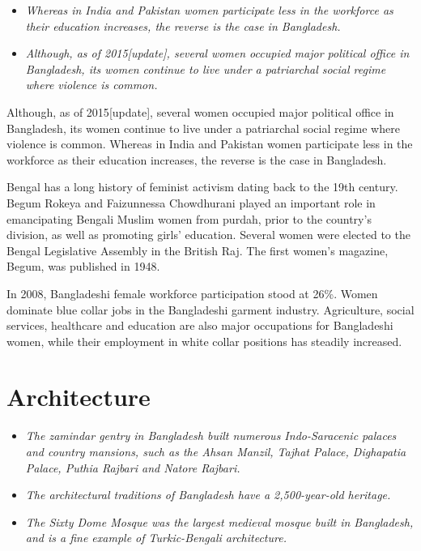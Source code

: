 \begin{itemize}
\item
  \emph{Whereas in India and Pakistan women participate less in the
  workforce as their education increases, the reverse is the case in
  Bangladesh.}
\item
  \emph{Although, as of 2015{[}update{]}, several women occupied major
  political office in Bangladesh, its women continue to live under a
  patriarchal social regime where violence is common.}
\end{itemize}

Although, as of 2015{[}update{]}, several women occupied major political
office in Bangladesh, its women continue to live under a patriarchal
social regime where violence is common. Whereas in India and Pakistan
women participate less in the workforce as their education increases,
the reverse is the case in Bangladesh.

Bengal has a long history of feminist activism dating back to the 19th
century. Begum Rokeya and Faizunnessa Chowdhurani played an important
role in emancipating Bengali Muslim women from purdah, prior to the
country's division, as well as promoting girls' education. Several women
were elected to the Bengal Legislative Assembly in the British Raj. The
first women's magazine, Begum, was published in 1948.

In 2008, Bangladeshi female workforce participation stood at 26\%. Women
dominate blue collar jobs in the Bangladeshi garment industry.
Agriculture, social services, healthcare and education are also major
occupations for Bangladeshi women, while their employment in white
collar positions has steadily increased.

\section{Architecture}\label{architecture}

\begin{itemize}
\item
  \emph{The zamindar gentry in Bangladesh built numerous Indo-Saracenic
  palaces and country mansions, such as the Ahsan Manzil, Tajhat Palace,
  Dighapatia Palace, Puthia Rajbari and Natore Rajbari.}
\item
  \emph{The architectural traditions of Bangladesh have a 2,500-year-old
  heritage.}
\item
  \emph{The Sixty Dome Mosque was the largest medieval mosque built in
  Bangladesh, and is a fine example of Turkic-Bengali architecture.}
\end{itemize}

